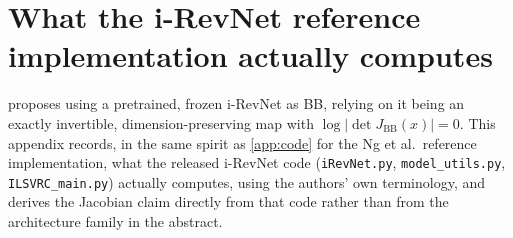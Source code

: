 \section{What the i-RevNet reference implementation actually computes}
\label{app:irevnet}

 proposes using a pretrained, frozen i-RevNet \cite{jacobsen2018} as BB, relying on it being
an exactly invertible, dimension-preserving map with $\log|\det J_{\mathrm{BB}}(x)|=0$. This appendix records,
in the same spirit as \cref{app:code} for the Ng et al.\ reference implementation, what the released
i-RevNet code (\texttt{iRevNet.py}, \texttt{model\_utils.py}, \texttt{ILSVRC\_main.py}) actually computes,
using the authors' own terminology, and derives the Jacobian claim directly from that code rather than from
the architecture family in the abstract.

